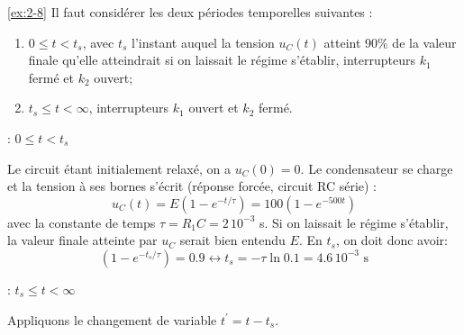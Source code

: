 \begin{solexercise}{\ref{ex:2-8}}
	\label{solex:2-8}
Il faut consid\'erer les deux p\'eriodes temporelles suivantes :
\begin{enumerate}
	\item $0\leq t < t_s$, avec $t_s$ l'instant auquel la tension $u_C(t)$ atteint 90\% de la
	valeur finale qu'elle atteindrait si on laissait le r\'egime
	s'\'etablir, interrupteurs $k_1$ ferm\'e et $k_2$ ouvert;
	\item $t_s\leq t < \infty$, interrupteurs $k_1$ ouvert et $k_2$ ferm\'e.
\end{enumerate}
  : $0\leq t < t_s$

Le circuit \'etant initialement relax\'e, on a $u_C(0)=0$. Le condensateur
se charge et la tension \`a ses  bornes s'\'ecrit (r\'eponse forc\'ee, circuit
RC s\'erie) :
\[u_C(t)=E(1-e^{-t/\tau})=100(1-e^{-500 t})\]
avec la constante de temps $\tau=R_1C=2\, 10^{-3}$ s.
Si on laissait le r\'egime s'\'etablir, la valeur finale atteinte par
$u_C$ serait bien entendu $E$. En $t_s$, on doit donc avoir:
\[(1-e^{-t_s/\tau})=0.9 \leftrightarrow t_s=-\tau\ln 0.1 = 4.6\,
10^{-3}\text{~s}\]

  : $t_s\leq t < \infty$

Appliquons le changement de variable $t^{'}=t-t_s$.


\end{solexercise}
